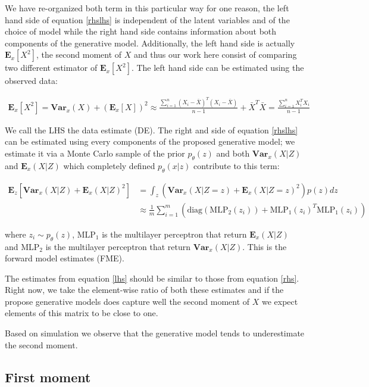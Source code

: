 \documentclass{article}
\newcommand{\Vx}{\textbf{Var}_x}
\newcommand{\Ex}{\textbf{E}_x}
\newcommand{\Ez}{\textbf{E}_z}
\begin{document}
We have re-organized both term in this particular way for one reason, the left hand side of equation \ref{rhslhs} is independent of the latent variables and of the choice of model while the right hand side contains information about both components of the generative model. Additionally, the left hand side is actually $\Ex[X^2]$, the second moment of $X$ and thus our work here consist of comparing two different estimator of $\Ex[X^2]$. The left hand side can be estimated using the observed data:  

\begin{align}
\Ex[X^2] = \Vx(X)+ (\Ex[X])^2 \approx \frac{\sum_{i=1}^n(X_i-\bar{X})^T(X_i-\bar{X})}{n-1} + \bar{X}^T\bar{X} = \frac{\sum_{i=1}^n X_i^TX_i}{n-1}
\label{lhs}
\end{align}

We call the LHS the data estimate (DE). The right and side of equation \ref{rhslhs} can be estimated using every components of the proposed generative model; we estimate it via a Monte Carlo sample of the prior $p_\theta(z)$ and both $\Vx(X|Z)$ and $\Ex(X|Z)$ which completely defined $p_\theta(x|z)$ contribute to this term:

\begin{align}
\Ez[\Vx(X|Z) + \Ex(X|Z)^2] &= \int_z (\Vx(X|Z=z)+\Ex(X|Z=z)^2)p(z) dz \\ 
&\approx \frac{1}{m} \sum_{i=1}^m ( \text{diag}(\text{MLP}_2(z_i)) + \text{MLP}_1(z_i)^T\text{MLP}_1(z_i))
\label{rhs}
\end{align}

where $z_i \sim p_\theta(z)$, MLP$_1$ is the multilayer perceptron that return $\Ex(X|Z)$ and MLP$_2$ is the multilayer perceptron that return $\Vx(X|Z)$. This is the forward model estimates (FME). 

\bigskip

The estimates from equation \ref{lhs} should be similar to those from equation \ref{rhs}. Right now, we take the element-wise ratio of both these estimates and if the propose generative models does capture well the second moment of $X$ we expect elements of this matrix to be close to one.

\bigskip

Based on simulation we observe that the generative model tends to underestimate the second moment.

\subsection{First moment}
\end{document}
